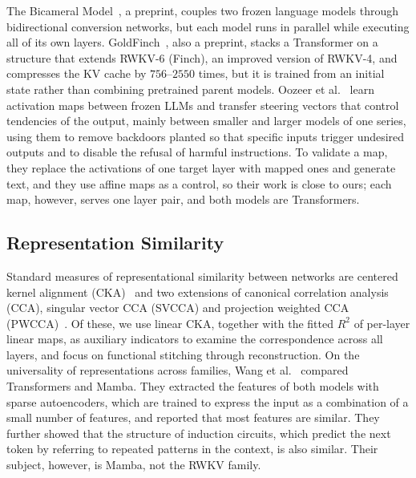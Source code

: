 \documentclass[conference]{IEEEtran}
\begin{document}
The Bicameral Model~\cite{flamant2026bicameralmodelbidirectionalhiddenstate}, a preprint, couples two frozen language models through
bidirectional conversion networks, but each model runs in parallel while executing all of its own layers. GoldFinch~\cite{goldstein2024goldfinchhighperformancerwkvtransformer},
also a preprint, stacks a Transformer on a structure that extends RWKV-6 (Finch), an improved version of RWKV-4, and
compresses the KV cache by $756$--$2550$ times, but it is trained from an initial state rather than combining pretrained parent
models. Oozeer et al.~\cite{oozeer2025activation} learn activation maps between frozen LLMs and transfer steering vectors that control
tendencies of the output, mainly between smaller and larger models of one series, using them to remove backdoors planted so that specific inputs trigger undesired outputs and to
disable the refusal of harmful instructions. To validate a
map, they replace the activations of one target layer with mapped ones and generate text, and they use affine maps as a control, so
their work is close to ours; each map, however, serves one layer pair, and both models are Transformers.

\subsection{Representation Similarity}
Standard measures of representational similarity between networks are centered kernel alignment (CKA)~\cite{pmlr-v97-kornblith19a}
and two extensions of canonical correlation analysis (CCA), singular vector CCA (SVCCA) and projection weighted CCA
(PWCCA)~\cite{3295222.3295356,3327345.3327475}.
Of these, we use linear CKA, together with the fitted $R^2$ of per-layer linear maps, as auxiliary indicators to examine the
correspondence across all layers, and focus on functional stitching
through reconstruction. On the universality of representations across families, Wang et al.~\cite{wang2025towards} compared
Transformers and Mamba. They extracted the features of both models with sparse autoencoders, which are trained to express the input
as a combination of a small number of features, and reported that most features are similar. They further showed that the structure
of induction circuits, which predict the next token by referring to repeated patterns in the context, is also similar. Their subject,
however, is Mamba, not the RWKV family.
\end{document}
